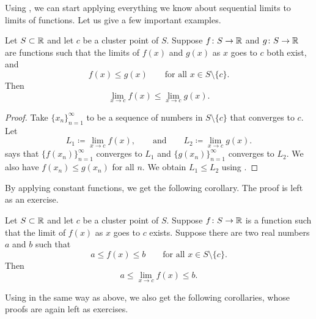 Using , 
we can start applying everything we know about
sequential limits to limits of functions.  Let us give a few important
examples.

\begin{cor}
Let $S \subset {\mathbb{R}}$ and let $c$ be a cluster point of $S$.  
Suppose $f \colon S \to
{\mathbb{R}}$ and $g \colon S \to {\mathbb{R}}$ are functions
such that
the limits of $f(x)$ and $g(x)$ as $x$ goes to $c$ both exist,
and
\begin{equation*}
f(x) \leq g(x) \qquad \text{for all } x \in S \setminus \{ c \}.
\end{equation*}
Then
\begin{equation*}
\lim_{x\to c} f(x) \leq \lim_{x\to c} g(x) .
\end{equation*}
\end{cor}

\begin{proof}
Take $\{ x_n \}_{n=1}^\infty$ to be a sequence of numbers in $S \setminus \{ c \}$
that converges to $c$.  Let
\begin{equation*}
L_1 \coloneqq \lim_{x\to c} f(x), \qquad \text{and} \qquad L_2 \coloneqq \lim_{x\to c} g(x) .
\end{equation*}
 says that $\bigl\{ f(x_n) \bigr\}_{n=1}^\infty$ converges to
$L_1$ and $\bigl\{ g(x_n) \bigr\}_{n=1}^\infty$ converges to $L_2$.  We also
have $f(x_n) \leq g(x_n)$ for all $n$.
We obtain $L_1 \leq L_2$ using
.
\end{proof}

By applying constant functions, we get the following corollary.  The
proof is left as an exercise.

\begin{cor} \label{fconstineq:cor}
Let $S \subset {\mathbb{R}}$ and let $c$ be a cluster point of $S$.  Suppose $f \colon S \to
{\mathbb{R}}$ is a function such that the limit of $f(x)$ as $x$ goes to $c$
exists.
Suppose there are two real numbers $a$ and $b$ such that
\begin{equation*}
a \leq f(x) \leq b \qquad \text{for all } x \in S \setminus \{ c \}.
\end{equation*}
Then
\begin{equation*}
a \leq \lim_{x\to c} f(x) \leq b .
\end{equation*}
\end{cor}

Using  in the same way as above, we also get
the following corollaries, whose proofs are again left as exercises.

